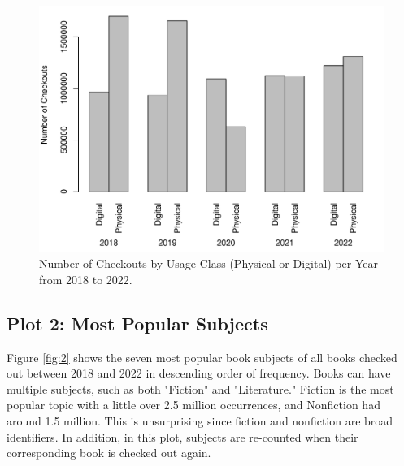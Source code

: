\documentclass[10pt]{article}\usepackage[]{graphicx}\usepackage[]{xcolor}
\makeatletter
\def\maxwidth{ %
  \ifdim\Gin@nat@width>\linewidth
    \linewidth
  \else
    \Gin@nat@width
  \fi
}
\newenvironment{knitrout}{}{} %
\makeatother
\begin{document}
\begin{figure}[H]
\begin{center}
\begin{knitrout}
\color{fgcolor}
\includegraphics[width=\maxwidth]{figure/plot1-1} 
\end{knitrout}
  \end{center}
\caption{Number of Checkouts by Usage Class (Physical or Digital) per Year from 2018 to 2022.}\label{fig:1}
\end{figure}

\subsection{Plot 2: Most Popular Subjects}

Figure \ref{fig:2} shows the seven most popular book subjects of all books checked out between 2018 and 2022 in descending order of frequency. Books can have multiple subjects, such as both "Fiction" and "Literature." Fiction is the most popular topic with a little over 2.5 million occurrences, and Nonfiction had around 1.5 million. This is unsurprising since fiction and nonfiction are broad identifiers. In addition, in this plot, subjects are re-counted when their corresponding book is checked out again.
\end{document}
